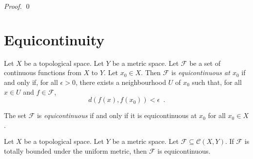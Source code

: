 \begin{proof}
    \pf
    \qed
\end{proof}

\section{Equicontinuity}

\begin{definition}[Equicontinuous]
    Let $X$ be a topological space. Let $Y$ be a metric space. Let $\mathcal{F}$ be a set of continuous functions from $X$ to $Y$.
    Let $x_0 \in X$. Then $\mathcal{F}$ is \emph{equicontinuous at $x_0$} if and only if, for all $\epsilon > 0$, there exists a
    neighbourhood $U$ of $x_0$ such that, for all $x \in U$ and $f \in \mathcal{F}$,
    \[ d(f(x),f(x_0)) < \epsilon \enspace . \]

    The set $\mathcal{F}$ is \emph{equicontinuous} if and only if it is equicontinuous at $x_0$ for all $x_0 \in X$.
\end{definition}

\begin{lemma}
    \label{lemma:totally_bounded_equicontinuous}
    Let $X$ be a topological space. Let $Y$ be a metric space. Let $\mathcal{F} \subseteq \mathcal{C}(X,Y)$. If $\mathcal{F}$
    is totally bounded under the uniform metric, then $\mathcal{F}$ is equicontinuous.
\end{lemma}

